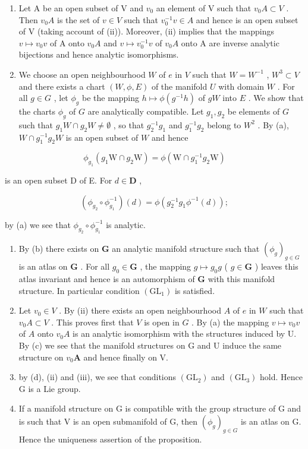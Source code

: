 \begin{enumerate}
\def\labelenumi{(\alph{enumi})}
\item
  Let A be an open subset of V and \(v_{0}\) an element of V such that \(v_{0}A \subset V\) . Then \(v_{0}A\) is the set of \(v \in V\) such that \(v_{0}^{-1}v \in A\) and hence is an open subset of V (taking account of (ii)). Moreover, (ii) implies that the mappings \(v \mapsto v_{0}v\) of A onto \(v_{0}A\) and \(v \mapsto v_{0}^{-1}v\) of \(v_{0}A\) onto A are inverse analytic bijections and hence analytic isomorphisms.
\item
  We choose an open neighbourhood \(W\) of \(e\) in \(V\) such that \(W = W^{-1}\) , \(W^3 \subset V\) and there exists a chart \((W, \phi, E)\) of the manifold \(U\) with domain \(W\) . For all \(g \in G\) , let \(\phi_g\) be the mapping \(h \mapsto \phi(g^{-1}h)\) of \(gW\) into \(E\) . We show that the charts \(\phi_g\) of \(G\) are analytically compatible. Let \(g_1, g_2\) be elements of \(G\) such that \(g_1W \cap g_2W \neq \emptyset\) , so that \(g_2^{-1}g_1\) and \(g_1^{-1}g_2\) belong to \(W^2\) . By (a), \(W \cap g_1^{-1}g_2W\) is an open subset of \(W\) and hence
\end{enumerate}

\[
\phi_ {g _ {1}} (g _ {1} \mathrm{W} \cap g _ {2} \mathrm{W}) = \phi (\mathrm{W} \cap g _ {1} ^ {- 1} g _ {2} \mathrm{W})
\]

is an open subset D of E. For \(d \in \mathbf{D}\) ,

\[
\left(\phi_ {g _ {2}} \circ \phi_ {g _ {1}} ^ {- 1}\right) (d) = \phi \left(g _ {2} ^ {- 1} g _ {1} \phi^ {- 1} (d)\right);
\]

by (a) we see that \(\phi_{g_2} \circ \phi_{g_1}^{-1}\) is analytic.

\begin{enumerate}
\def\labelenumi{(\alph{enumi})}
\setcounter{enumi}{2}
\item
  By (b) there exists on \(\mathbf{G}\) an analytic manifold structure such that \((\phi_g)_{g\in G}\) is an atlas on \(\mathbf{G}\) . For all \(g_0\in \mathbf{G}\) , the mapping \(g\mapsto g_0g\) ( \(g\in \mathbf{G}\) ) leaves this atlas invariant and hence is an automorphism of \(\mathbf{G}\) with this manifold structure. In particular condition \((\mathrm{GL}_1)\) is satisfied.
\item
  Let \(v_{0} \in V\) . By (ii) there exists an open neighbourhood \(A\) of \(e\) in \(W\) such that \(v_{0}A \subset V\) . This proves first that \(V\) is open in \(G\) . By (a) the mapping \(v \mapsto v_{0}v\) of \(A\) onto \(v_{0}A\) is an analytic isomorphism with the structures induced by U. By (c) we see that the manifold structures on G and U induce the same structure on \(v_{0}\mathbf{A}\) and hence finally on V.
\item
  by (d), (ii) and (iii), we see that conditions \((\mathrm{GL}_2)\) and \((\mathrm{GL}_3)\) hold. Hence G is a Lie group.
\item
  If a manifold structure on G is compatible with the group structure of G and is such that V is an open submanifold of G, then \((\phi_{g})_{g\in G}\) is an atlas on G. Hence the uniqueness assertion of the proposition.
\end{enumerate}

